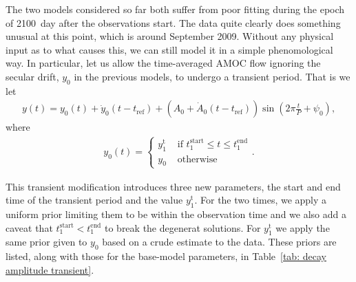 \documentclass{article}
\newcommand{\tref}{t_{\textrm{ref}}}
\begin{document}
The two models considered so far both suffer from poor fitting during the epoch
of 2100~day after the observations start. The data quite clearly does something
unusual at this point, which is around September 2009. Without any physical
input as to what causes this, we can still model it in a simple phenomological
way. In particular, let us allow the time-averaged AMOC flow ignoring the
secular drift, $y_0$ in the previous models, to undergo a transient period.
That is we let
\begin{align}
y(t) = y_0(t) + \dot{y}_0(t - \tref) + (A_0 + \dot{A}_0(t-\tref)) \sin\left(2\pi \frac{t}{P} + \psi_0\right),
\end{align}
where
\begin{align}
y_0(t) = \left\{
\begin{array}{cl}
y_1^{\textrm{t}} & \textrm{ if } t_1^{\textrm{start}} \le t \le t_1^{\textrm{end}} \\
y_0 & \textrm{ otherwise }
\end{array}
\right..
\label{eqn: transient}
\end{align}

This transient modification introduces three new parameters, the start and end
time of the transient period and the value $y_1^{\textrm{t}}$. For the two times,
we apply a uniform prior limiting them to be within the observation time and
we also add a caveat that $t_1^{\textrm{start}} < t_1^{\textrm{end}}$ to break
the degenerat solutions. For $y_1^\textrm{t}$ we apply the same prior given to
$y_0$ based on a crude estimate to the data. These priors are listed, along with
those for the base-model parameters, in Table~\ref{tab: decay amplitude transient}.
%
\end{document}
